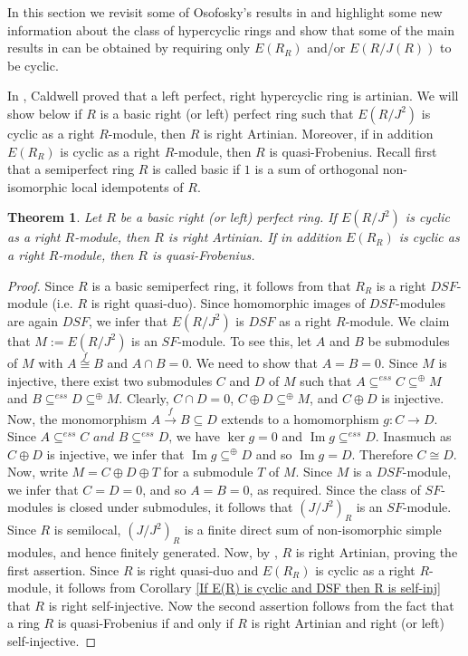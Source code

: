 \documentclass{amsart}
\newtheorem{theorem}{Theorem}[section]
\theoremstyle{plain}
\numberwithin{equation}{section}
\begin{document}
In this section we revisit some of Osofosky's
results in \cite{O1} and highlight some new information about the class
of hypercyclic rings and show that some of the main results in \cite{O1}
can be obtained by requiring only $E (R_{R})$ and/or $E (R/J (R))$ to be cyclic. 

\medskip In \cite{C},
Caldwell proved that a left perfect, right hypercyclic ring is artinian. We will show below if $R$ is a basic right (or left) perfect ring such that $E (R/J^{2})$ is cyclic as a right $R$-module, then $R$ is right Artinian. Moreover, if in addition $E (R_{R})$ is cyclic as a right $R$-module, then $R$ is quasi-Frobenius. Recall first that a semiperfect ring $R$ is called basic if $1$ is a sum of orthogonal non-isomorphic local idempotents of $R$. 


\begin{theorem}
Let $R$ be a basic right (or left) perfect ring. If $E (R/J^{2})$ is cyclic as a right $R$-module, then $R$ is right Artinian. If in addition $E (R_{R})$ is cyclic as a right $R$-module, then $R$ is quasi-Frobenius. 
\end{theorem}


\begin{proof}
Since $R$ is a basic semiperfect ring, it follows from \cite[Corollary 2.4]{IY 6}
that $R_{R}$ is a right $D S F$-module (i.e. $R$ is right quasi-duo). Since homomorphic images of $D S F$-modules are again $D S F$, we infer that $E (R/J^{2})$ is $D S F$ as a right $R$-module. We claim that $M:=E (R/J^{2})$ is an $S F$-module. To see this, let $A$ and $B$ be submodules of $M$ with $A\overset{f}{ \cong }B$ and $A \cap B =0.$ We need to show that $A =B =0$. Since $M$ is injective, there exist two submodules $C$ and $D$ of $M$ such that $A  \subseteq ^{e s s}C  \subseteq ^{ \oplus }M$ and $B  \subseteq ^{e s s}D  \subseteq ^{ \oplus }M\text{.}$ Clearly, $C \cap D =0$, $C \oplus D  \subseteq ^{ \oplus }M$, and $C \oplus D$ is injective. Now, the monomorphism $A\overset{f}{ \longrightarrow }B \subseteq D$ extends to a homomorphism $g :C \longrightarrow D\text{.}$ Since $A  \subseteq ^{e s s}C$ $ and $ $B  \subseteq ^{e s s}D\text{,}$ we have $\ker g =0$ and $\ensuremath{\operatorname*{Im}}g  \subseteq ^{e s s}D$. Inasmuch as $C \oplus D$ is injective, we infer that $\ensuremath{\operatorname*{Im}}g  \subseteq ^{ \oplus }D$ and so $\ensuremath{\operatorname*{Im}}g =D$. Therefore $C \cong D$. Now, write $M =C \oplus D \oplus T$ for a submodule $T$ of $M$. Since $M$ is a $D S F$-module, we infer that $C =D =0$, and so $A =B =0$, as required. Since the class of $S F$-modules is closed under submodules, it follows that $(J/J^{2})_{R}$ is an $S F$-module. Since $R$ is semilocal, $(J/J^{2})_{R}$ is a finite direct sum of non-isomorphic simple modules, and hence finitely generated. Now, by \cite[Lemma 11]{O3},
$R$ is right Artinian, proving the first assertion. Since $R$ is right quasi-duo and $E (R_{R})$ is cyclic as a right $R$-module, it follows from Corollary \ref{If E(R) is cyclic and DSF then R is self-inj}
that $R$ is right self-injective. Now the second assertion follows from the fact that a ring $R$ is quasi-Frobenius if and only if $R$ is right Artinian and right (or left) self-injective. 
\end{proof}
\end{document}
